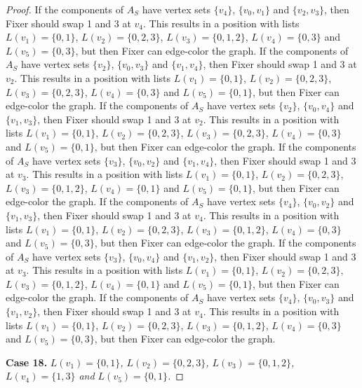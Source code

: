 \documentclass[12pt]{amsart}
\theoremstyle{plain}
\theoremstyle{definition}
\theoremstyle{remark}
\begin{document}
\begin{proof}
If the components of $A_S$ have vertex sets $\{v_4\}$, $\{v_0, v_1\}$ and $\{v_2, v_3\}$, then Fixer should swap 1 and 3 at $v_4$. This results in a position with lists $L(v_1) = \{0, 1\}$, $L(v_2) = \{0, 2, 3\}$, $L(v_3) = \{0, 1, 2\}$, $L(v_4) = \{0, 3\}$ and $L(v_5) = \{0, 3\}$, but then Fixer can edge-color the graph.
If the components of $A_S$ have vertex sets $\{v_2\}$, $\{v_0, v_3\}$ and $\{v_1, v_4\}$, then Fixer should swap 1 and 3 at $v_2$. This results in a position with lists $L(v_1) = \{0, 1\}$, $L(v_2) = \{0, 2, 3\}$, $L(v_3) = \{0, 2, 3\}$, $L(v_4) = \{0, 3\}$ and $L(v_5) = \{0, 1\}$, but then Fixer can edge-color the graph.
If the components of $A_S$ have vertex sets $\{v_2\}$, $\{v_0, v_4\}$ and $\{v_1, v_3\}$, then Fixer should swap 1 and 3 at $v_2$. This results in a position with lists $L(v_1) = \{0, 1\}$, $L(v_2) = \{0, 2, 3\}$, $L(v_3) = \{0, 2, 3\}$, $L(v_4) = \{0, 3\}$ and $L(v_5) = \{0, 1\}$, but then Fixer can edge-color the graph.
If the components of $A_S$ have vertex sets $\{v_3\}$, $\{v_0, v_2\}$ and $\{v_1, v_4\}$, then Fixer should swap 1 and 3 at $v_3$. This results in a position with lists $L(v_1) = \{0, 1\}$, $L(v_2) = \{0, 2, 3\}$, $L(v_3) = \{0, 1, 2\}$, $L(v_4) = \{0, 1\}$ and $L(v_5) = \{0, 1\}$, but then Fixer can edge-color the graph.
If the components of $A_S$ have vertex sets $\{v_4\}$, $\{v_0, v_2\}$ and $\{v_1, v_3\}$, then Fixer should swap 1 and 3 at $v_4$. This results in a position with lists $L(v_1) = \{0, 1\}$, $L(v_2) = \{0, 2, 3\}$, $L(v_3) = \{0, 1, 2\}$, $L(v_4) = \{0, 3\}$ and $L(v_5) = \{0, 3\}$, but then Fixer can edge-color the graph.
If the components of $A_S$ have vertex sets $\{v_3\}$, $\{v_0, v_4\}$ and $\{v_1, v_2\}$, then Fixer should swap 1 and 3 at $v_3$. This results in a position with lists $L(v_1) = \{0, 1\}$, $L(v_2) = \{0, 2, 3\}$, $L(v_3) = \{0, 1, 2\}$, $L(v_4) = \{0, 1\}$ and $L(v_5) = \{0, 1\}$, but then Fixer can edge-color the graph.
If the components of $A_S$ have vertex sets $\{v_4\}$, $\{v_0, v_3\}$ and $\{v_1, v_2\}$, then Fixer should swap 1 and 3 at $v_4$. This results in a position with lists $L(v_1) = \{0, 1\}$, $L(v_2) = \{0, 2, 3\}$, $L(v_3) = \{0, 1, 2\}$, $L(v_4) = \{0, 3\}$ and $L(v_5) = \{0, 3\}$, but then Fixer can edge-color the graph.

\noindent\textbf{Case 18.  }\textit{$L(v_1) = \{0, 1\}$, $L(v_2) = \{0, 2, 3\}$, $L(v_3) = \{0, 1, 2\}$, $L(v_4) = \{1, 3\}$ and $L(v_5) = \{0, 1\}$.}


\end{proof}
\end{document}
